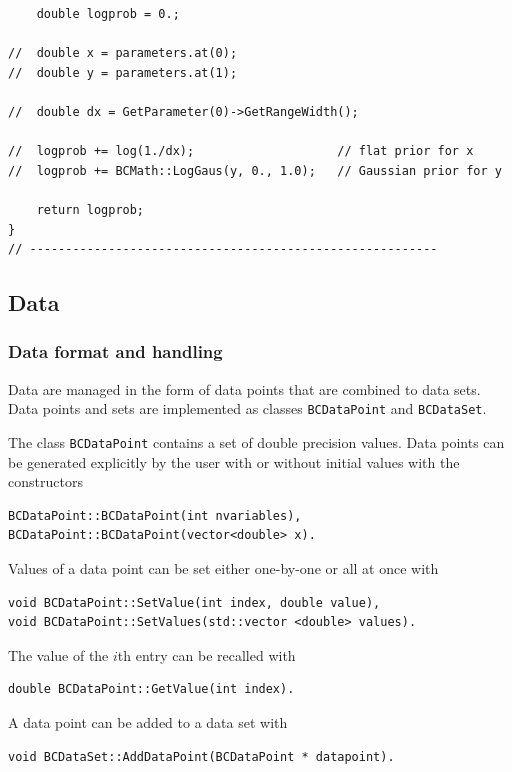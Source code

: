 \documentclass[11pt, a4paper]{article}
\begin{document}
\begin{verbatim}
	double logprob = 0.;

//	double x = parameters.at(0);
//	double y = parameters.at(1);

//	double dx = GetParameter(0)->GetRangeWidth();

//	logprob += log(1./dx);                    // flat prior for x
//	logprob += BCMath::LogGaus(y, 0., 1.0);   // Gaussian prior for y

	return logprob;
}
// ---------------------------------------------------------
\end{verbatim}


\subsection{Data}
\label{subsection:data}

\subsubsection{Data format and handling}
\label{subsection:dataformat}

Data are managed in the form of data points that are combined to data
sets. Data points and sets are implemented as classes
\verb|BCDataPoint| and \verb|BCDataSet|.

The class \verb|BCDataPoint| contains a set of double precision
values. Data points can be generated explicitly by the user with or
without initial values with the constructors
%
\begin{verbatim}
BCDataPoint::BCDataPoint(int nvariables),
BCDataPoint::BCDataPoint(vector<double> x).
\end{verbatim}

Values of a data point can be set either one-by-one or all at once
with
%
\begin{verbatim}
void BCDataPoint::SetValue(int index, double value),
void BCDataPoint::SetValues(std::vector <double> values).
\end{verbatim}

The value of the $i$th entry can be recalled with
%
\begin{verbatim}
double BCDataPoint::GetValue(int index).
\end{verbatim}

A data point can be added to a data set with
%
\begin{verbatim}
void BCDataSet::AddDataPoint(BCDataPoint * datapoint).
\end{verbatim}
\end{document}

